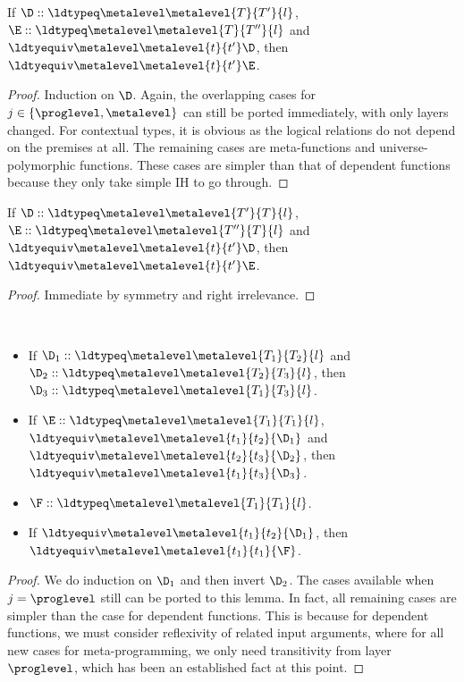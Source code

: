 \begin{lemma}
  If $\D :: \ldtypeq \metalevel \metalevel{T}{T'}{l}$, $\E :: \ldtypeq \metalevel \metalevel{T}{T''}{l}$ and
  $\ldtyequiv \metalevel \metalevel{t}{t'}\D$, then $\ldtyequiv \metalevel \metalevel{t}{t'}\E$.
\end{lemma}
\begin{proof}
  Induction on $\D$. %
  Again, the overlapping cases for $j \in \{\proglevel, \metalevel\}$ can still be ported immediately,
  with only layers changed. %
  For contextual types, it is obvious as the logical relations do not depend on the
  premises at all. %
  The remaining cases are meta-functions and universe-polymorphic functions. %
  These cases are simpler than that of dependent functions because they only take
  simple IH to go through. 
\end{proof}

\begin{lemma}
  If $\D :: \ldtypeq \metalevel \metalevel{T'}{T}{l}$, $\E :: \ldtypeq \metalevel \metalevel{T''}{T}{l}$ and
  $\ldtyequiv \metalevel \metalevel{t}{t'}\D$, then $\ldtyequiv \metalevel \metalevel{t}{t'}\E$.
\end{lemma}
\begin{proof}
  Immediate by symmetry and right irrelevance. 
\end{proof}

\begin{lemma} $ $
  \begin{itemize}
  \item If $\D_1 :: \ldtypeq \metalevel \metalevel{T_1}{T_2}{l}$ and $\D_2 :: \ldtypeq \metalevel
    \metalevel{T_2}{T_3}{l}$, then $\D_3 :: \ldtypeq \metalevel \metalevel{T_1}{T_3}{l}$.
  \item If $\E :: \ldtypeq \metalevel \metalevel{T_1}{T_1}{l}$, $\ldtyequiv \metalevel \metalevel{t_1}{t_2}{\D_1}$ and
    $\ldtyequiv \metalevel \metalevel{t_2}{t_3}{\D_2}$, then $\ldtyequiv \metalevel \metalevel{t_1}{t_3}{\D_3}$.
  \item $\F :: \ldtypeq \metalevel \metalevel{T_1}{T_1}{l}$.
  \item If $\ldtyequiv \metalevel \metalevel{t_1}{t_2}{\D_1}$, then $\ldtyequiv \metalevel \metalevel{t_1}{t_1}{\F}$.
  \end{itemize}
\end{lemma}
\begin{proof}
  We do induction on $\D_1$ and then invert $\D_2$. %
  The cases available when $j = \proglevel$ still can be ported to this lemma. %
  In fact, all remaining cases are simpler than the case for dependent functions. %
  This is because for dependent functions, we must consider reflexivity of related
  input arguments, where for all new cases for meta-programming, we only need
  transitivity from layer $\proglevel$, which has been an established fact at this point. %
\end{proof}

